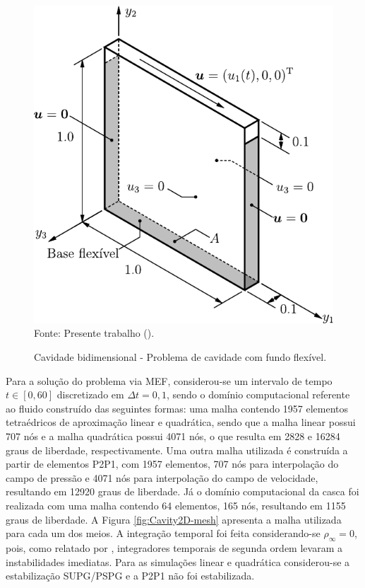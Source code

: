 \begin{figure}[h!]
    \centering
    \caption{Cavidade bidimensional - Problema de cavidade com fundo flexível.}
    \includegraphics[width=0.5\linewidth]{Figuras/FSI-Cavity2D/FSI-Cavity2D.pdf}
    \\Fonte: Presente trabalho (\the\year).
    \label{fig:cavity2D}
\end{figure}

Para a solução do problema via MEF, considerou-se um intervalo de tempo $t\in[0,60]$ discretizado em $\Delta t=0,1$, sendo o domínio computacional referente ao fluido construído das seguintes formas: uma malha contendo 1957 elementos tetraédricos de aproximação linear e quadrática, sendo que a malha linear possui 707 nós e a malha quadrática possui 4071 nós, o que resulta em 2828 e 16284 graus de liberdade, respectivamente. Uma outra malha utilizada é construída a partir de elementos P2P1, com 1957 elementos, 707 nós para interpolação do campo de pressão e 4071 nós para interpolação do campo de velocidade, resultando em 12920 graus de liberdade. Já o domínio computacional da casca foi realizada com uma malha contendo 64 elementos, 165 nós, resultando em 1155 graus de liberdade. A Figura \ref{fig:Cavity2D-mesh} apresenta a malha utilizada para cada um dos meios. A integração temporal foi feita considerando-se $\rho_\infty=0$, pois, como relatado por , integradores temporais de segunda ordem levaram a instabilidades imediatas. Para as simulações linear e quadrática considerou-se a estabilização SUPG/PSPG e a P2P1 não foi estabilizada.

